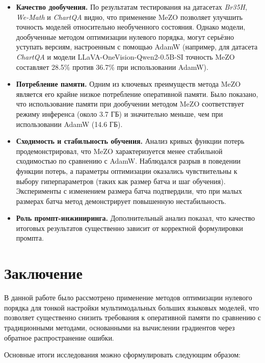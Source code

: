 \documentclass[LI,KR]{HSEUniversity}
\begin{document}
\begin{itemize}
    \item \textbf{Качество дообучения.} По результатам тестирования на датасетах \textit{Br35H}, \textit{We-Math} и \textit{ChartQA} видно, что применение MeZO позволяет улучшить точность моделей относительно необученного состояния.
Однако модели, дообученные методом оптимизации нулевого порядка, могут серьёзно уступать версиям, настроенным с помощью AdamW (например, для датасета \textit{ChartQA} и модели LLaVA-OneVision-Qwen2-0.5B-SI точность MeZO составляет 28.5\% против 36.7\% при использовании AdamW).

    \item \textbf{Потребление памяти.} Одним из ключевых преимуществ метода MeZO является его крайне низкое потребление оперативной памяти.
Было показано, что использование памяти при дообучении методом MeZO соответствует режиму инференса (около 3.7 ГБ) и значительно меньше, чем при использовании AdamW (14.6 ГБ).

    \item \textbf{Сходимость и стабильность обучения.} Анализ кривых функции потерь продемонстрировал, что MeZO характеризуется менее стабильной сходимостью по сравнению с AdamW.
Наблюдался разрыв в поведении функции потерь, а параметры оптимизации оказались чувствительны к выбору гиперпараметров (таких как размер батча и шаг обучения).
Эксперименты с изменением размера батча подтвердили, что при малых размерах батча метод демонстрирует повышенную нестабильность.

    \item \textbf{Роль промпт-инжиниринга.} Дополнительный анализ показал, что качество итоговых результатов существенно зависит от корректной формулировки промпта.
\end{itemize}

\chapter*{Заключение}

В данной работе было рассмотрено применение методов оптимизации нулевого порядка для тонкой настройки мультимодальных больших языковых моделей,
что позволяет существенно снизить требования к оперативной памяти по сравнению с традиционными методами,
основанными на вычислении градиентов через обратное распространение ошибки.

Основные итоги исследования можно сформулировать следующим образом:
\end{document}
